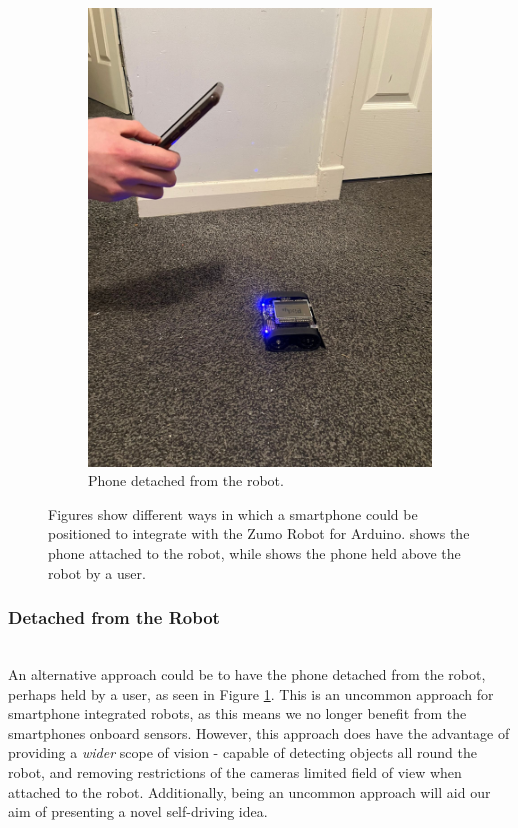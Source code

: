 \documentclass{l4proj}
\begin{document}
\begin{figure}[!ht]
\begin{subfigure}{0.40\textwidth}
        \includegraphics[width=\textwidth]{images/phone-detatched.jpeg}
        \caption{Phone detached from the robot.}
        \label{fig:phone-detach}
    \end{subfigure}
    \label{fig:phone-attachment}
    \caption{Figures show different ways in which a smartphone could be positioned to integrate with the Zumo Robot for Arduino.  shows the phone attached to the robot, while  shows the phone held above the robot by a user.}
\end{figure}

\subsubsection{Detached from the Robot} \hfill \\
An alternative approach could be to have the phone detached from the robot, perhaps held by a user, as seen in Figure \ref{fig:phone-detach}. This is an uncommon approach for smartphone integrated robots, as this means we no longer benefit from the smartphones onboard sensors. However, this approach does have the advantage of providing a \textit{wider} scope of vision - capable of detecting objects all round the robot, and removing restrictions of the cameras limited field of view when attached to the robot. Additionally, being an uncommon approach will aid our aim of presenting a novel self-driving idea.
\end{document}
